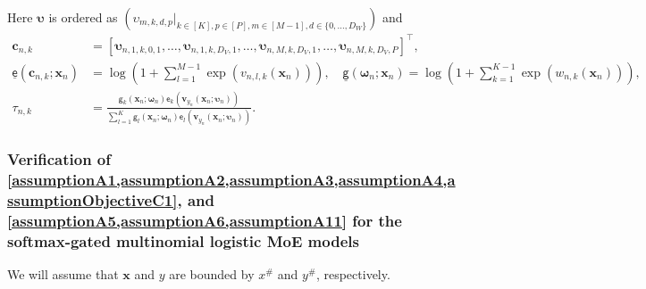 \documentclass{article}
\def\sfg{\mathsf{g}}
\def\ex{\mathsf{e}}
\def\vomega{{\bm{\omega}}}
\def\vupsilon{{\bm{\upsilon}}}
\def\evupsilon{\upsilon}
\def\vc{{\bm{c}}}
\def\vv{{\bm{v}}}
\def\vx{{\bm{x}}}
\def\evv{{v}}
\def\evw{{w}}
\def\evx{{x}}
\def\evy{{y}}
\begin{document}
Here $\vupsilon$ is ordered as $\left(\evupsilon_{m,k,d,p}\vert_{k\in[K],p\in [P], m\in[M-1], d\in\{0,\ldots,D_W\}}\right)$ and
\begin{align*}
    \vc_{n,k}&=[\vupsilon_{n,1,k,0,1},\dots,\vupsilon_{n,1,k,D_V,1},\dots,\vupsilon_{n,M,k,D_V,1},\dots,\vupsilon_{n,M,k,D_V,P}]^{\top},\\
     \underline{\ex}(\vc_{n,k};\vx_n)&=\log\left(1+\sum_{l=1}^{M-1} \exp\left(\evv_{n,l,k}(\vx_n)\right)\right), \quad \underline{\sfg}(\vomega_n;\vx_n)=\log\left(1+\sum_{k=1}^{K-1} \exp\left(\evw_{n,k}(\vx_n)\right)\right),\\
    \tau_{n,k}&=\frac{\sfg_k\left(\vx_n; \vomega_n \right) \ex_k(\vv_{y_n}(\vx_n;\vupsilon_n))}{\sum_{l=1}^{K}\sfg_l\left(\vx_n; \vomega_n \right) \ex_l(\vv_{y_n}(\vx_n;\vupsilon_n))}.
\end{align*}

\subsubsection{Verification of \texorpdfstring{\cref{assumptionA1,assumptionA2,assumptionA3,assumptionA4,assumptionObjectiveC1}}{\ref*{assumptionA1} to \ref*{assumptionObjectiveC1}}, and \texorpdfstring{\cref{assumptionA5,assumptionA6,assumptionA11}}{\ref*{assumptionA5},\ref*{assumptionA6} and \ref*{assumptionA11}} for the softmax-gated multinomial logistic MoE models}\label{proof_assumptions_theorem_onlineMM_SGMLMoE}

We will assume that $\vx$ and $\evy$ are bounded by $\evx^\#$ and $\evy^\#$, respectively.
\end{document}

